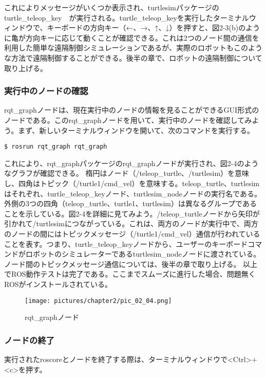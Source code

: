 これによりメッセージがいくつか表示され、turtlesimパッケージのturtle\_teleop\_key　が実行される。turtle\_teleop\_keyを実行したターミナルウィンドウで、キーボードの方向キー（←、→、↑、↓）を押すと、図2-3(b)のように亀が方向キーに応じて動くことが確認できる。これは2つのノード間の通信を利用した簡単な遠隔制御シミュレーションであるが、実際のロボットもこのような方法で遠隔制御することができる。後半の章で、ロボットの遠隔制御について取り上げる。

\subsubsection{実行中のノードの確認}

rqt\_graphノードは、現在実行中のノードの情報を見ることができるGUI形式のノードである。このrqt\_graphノードを用いて、実行中のノードを確認してみよう。まず、新しいターミナルウィンドウを開いて、次のコマンドを実行する。

\begin{lstlisting}[language=ROS]
$ rosrun rqt_graph rqt_graph
\end{lstlisting}

これにより、rqt\_graphパッケージのrqt\_graphノードが実行され、図2-4のようなグラフが確認できる。
楕円はノード（/teleop\_turtle、/turtlesim）を意味し、四角はトピック（/turtle1/cmd\_vel）を意味する。teleop\_turtle、turtlesim はそれぞれ、turtle\_teleop\_keyノード、turtlesim\_nodeノードの実行名である。外側の3つの四角（teleop\_turtle、turtle1、turtlesim）は異なるグループであることを示している。図2-4を詳細に見てみよう。/teleop\_turtleノードから矢印が引かれて/turtlesimにつながっている。これは、両方のノードが実行中で、両方のノードの間にはトピックメッセージ（/turtle1/cmd\_vel）通信が行われていることを表す。つまり、turtle\_teleop\_keyノードから、ユーザーのキーボードコマンドがロボットのシミュレーターであるturtlesim\_nodeノードに渡されている。ノード間のトピックメッセージ通信については、後半の章で取り上げる。
以上でROS動作テストは完了である。ここまでスムーズに進行した場合、問題無くROSがインストールされている。

\begin{figure}[h]
  \centering
  \texttt{[image: pictures/chapter2/pic\_02\_04.png]}
  \caption{rqt\_graphノード}
\end{figure}

\subsubsection{ノードの終了}
実行されたroscoreとノードを終了する際は、ターミナルウィンドウで<Ctrl>+<c>を押す。

